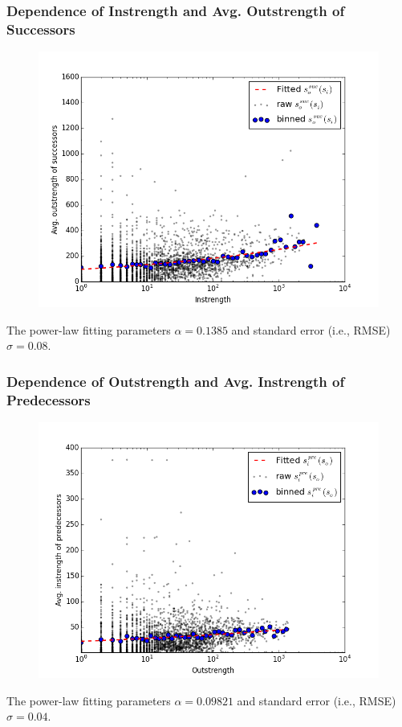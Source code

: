 \documentclass{beamer}
\begin{document}
\begin{frame}
\frametitle{Dependence of Instrength and Avg. Outstrength of Successors}
\begin{figure}
\includegraphics[width=0.8\linewidth]{figs/suc_out_in_s.png}
\end{figure}
\small{The power-law fitting parameters $\alpha=0.1385$ and standard error (i.e., RMSE) $\sigma=0.08$.}
\end{frame}

\begin{frame}
\frametitle{Dependence of Outstrength and Avg. Instrength of Predecessors}
\begin{figure}
\includegraphics[width=0.8\linewidth]{figs/pre_in_out_s.png}
\end{figure}
\small{The power-law fitting parameters $\alpha=0.09821$ and standard error (i.e., RMSE) $\sigma=0.04$.}
\end{frame}
\end{document}
